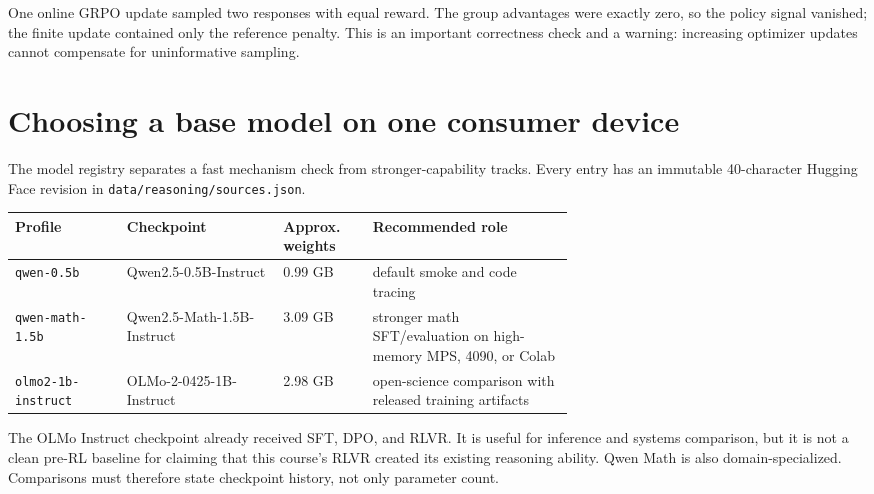 \documentclass[11pt]{article}
\begin{document}
One online GRPO update sampled two responses with equal reward. The group
advantages were exactly zero, so the policy signal vanished; the finite update
contained only the reference penalty. This is an important correctness check and
a warning: increasing optimizer updates cannot compensate for uninformative
sampling.

\section{Choosing a base model on one consumer device}
The model registry separates a fast mechanism check from stronger-capability
tracks.  Every entry has an immutable 40-character Hugging Face revision in
\texttt{data/reasoning/sources.json}.
\begin{center}
\begin{tabularx}{\linewidth}{p{0.20\linewidth}p{0.29\linewidth}p{0.16\linewidth}X}
\toprule
Profile & Checkpoint & Approx. weights & Recommended role \\
\midrule
\texttt{qwen-0.5b} & Qwen2.5-0.5B-Instruct & 0.99 GB & default smoke and code tracing \\
\texttt{qwen-math-1.5b} & Qwen2.5-Math-1.5B-Instruct & 3.09 GB & stronger math SFT/evaluation on high-memory MPS, 4090, or Colab \\
\texttt{olmo2-1b-instruct} & OLMo-2-0425-1B-Instruct & 2.98 GB & open-science comparison with released training artifacts \\
\bottomrule
\end{tabularx}
\end{center}
The OLMo Instruct checkpoint already received SFT, DPO, and RLVR.  It is useful
for inference and systems comparison, but it is not a clean pre-RL baseline for
claiming that this course's RLVR created its existing reasoning ability.  Qwen
Math is also domain-specialized.  Comparisons must therefore state checkpoint
history, not only parameter count.
\end{document}
